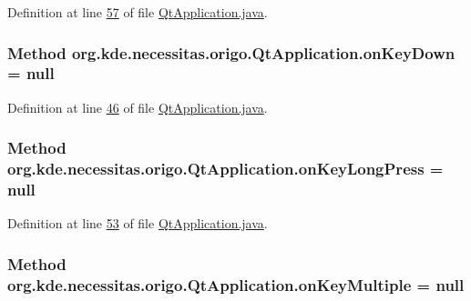 Definition at line \hyperlink{_qt_application_8java_source_l00057}{57} of file \hyperlink{_qt_application_8java_source}{Qt\-Application.\-java}.

\hypertarget{classorg_1_1kde_1_1necessitas_1_1origo_1_1_qt_application_aa7685aedb8e428ea4bc02e6ff6400ff6}{
\subsubsection[{on\-Key\-Down}]{\setlength{\rightskip}{0pt plus 5cm}Method org.\-kde.\-necessitas.\-origo.\-Qt\-Application.\-on\-Key\-Down = null\hspace{0.3cm}{\ttfamily [static]}}}\label{d0/da0/classorg_1_1kde_1_1necessitas_1_1origo_1_1_qt_application_aa7685aedb8e428ea4bc02e6ff6400ff6}


Definition at line \hyperlink{_qt_application_8java_source_l00046}{46} of file \hyperlink{_qt_application_8java_source}{Qt\-Application.\-java}.

\hypertarget{classorg_1_1kde_1_1necessitas_1_1origo_1_1_qt_application_a1f77504534fe0f052fb86e5410b2235f}{
\subsubsection[{on\-Key\-Long\-Press}]{\setlength{\rightskip}{0pt plus 5cm}Method org.\-kde.\-necessitas.\-origo.\-Qt\-Application.\-on\-Key\-Long\-Press = null\hspace{0.3cm}{\ttfamily [static]}}}\label{d0/da0/classorg_1_1kde_1_1necessitas_1_1origo_1_1_qt_application_a1f77504534fe0f052fb86e5410b2235f}


Definition at line \hyperlink{_qt_application_8java_source_l00053}{53} of file \hyperlink{_qt_application_8java_source}{Qt\-Application.\-java}.

\hypertarget{classorg_1_1kde_1_1necessitas_1_1origo_1_1_qt_application_a2543739047707bc93dd3e3b4e1258a94}{
\subsubsection[{on\-Key\-Multiple}]{\setlength{\rightskip}{0pt plus 5cm}Method org.\-kde.\-necessitas.\-origo.\-Qt\-Application.\-on\-Key\-Multiple = null\hspace{0.3cm}{\ttfamily [static]}}}\label{d0/da0/classorg_1_1kde_1_1necessitas_1_1origo_1_1_qt_application_a2543739047707bc93dd3e3b4e1258a94}



